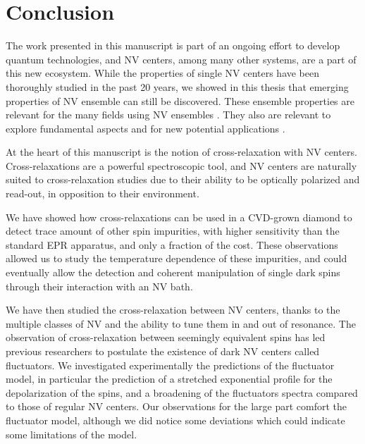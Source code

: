 \documentclass[a4paper,11pt]{report}
\title{}
\begin{document}
\chapter*{Conclusion}

The work presented in this manuscript is part of an ongoing effort to develop quantum technologies, and NV centers, among many other systems, are a part of this new ecosystem. While the properties of single NV centers have been thoroughly studied in the past 20 years, we showed in this thesis that emerging properties of NV ensemble can still be discovered. These ensemble properties are relevant for the many fields using NV ensembles \citep{ barry2020sensitivity, eills2022spin, fu2007characterization, perdriat2021spin}. They also are relevant to explore fundamental aspects \citep{choi2017observation, kucsko2018critical, angerer2018superradiant} and for new potential applications \citep{akhmedzhanov2017microwave, pellet2021optical, pellet2022spin}.

At the heart of this manuscript is the notion of cross-relaxation with NV centers. Cross-relaxations are a powerful spectroscopic tool, and NV centers are naturally suited to cross-relaxation studies due to their ability to be optically polarized and read-out, in opposition to their environment.

We have showed how cross-relaxations can be used in a CVD-grown diamond to detect trace amount of other spin impurities, with higher sensitivity than the standard EPR apparatus, and only a fraction of the cost. These observations allowed us to study the temperature dependence of these impurities, and could eventually allow the detection and coherent manipulation of single dark spins through their interaction with an NV bath.

We have then studied the cross-relaxation between NV centers, thanks to the multiple classes of NV and the ability to tune them in and out of resonance. The observation of cross-relaxation between seemingly equivalent spins has led previous researchers to postulate the existence of dark NV centers called fluctuators. We investigated experimentally the predictions of the fluctuator model, in particular the prediction of a stretched exponential profile for the depolarization of the spins, and a broadening of the fluctuators spectra compared to those of regular NV centers. Our observations for the large part comfort the fluctuator model, although we did notice some deviations which could indicate some limitations of the model. 
\end{document}
